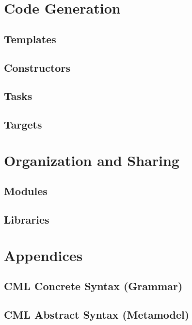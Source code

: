 \documentclass[a4paper,oneside,12pt, extrafontsizes]{memoir}
\begin{document}
\part{Code Generation}

  \chapter{Templates}
  \label{sec:templates}

  \chapter{Constructors}
  \label{sec:constructors}

  \chapter{Tasks}
  \label{sec:tasks}

  \chapter{Targets}
  \label{sec:targets}

\part{Organization and Sharing}

  \chapter{Modules}
  \label{ch:modules}

  \chapter{Libraries}
  \label{ch:libraries}

\part{Appendices}

\appendix

  \chapter{CML Concrete Syntax (Grammar)}
  \label{apx:concrete-syntax}
  

  \chapter{CML Abstract Syntax (Metamodel)}
  \label{apx:abstract-syntax}
  
\end{document}
